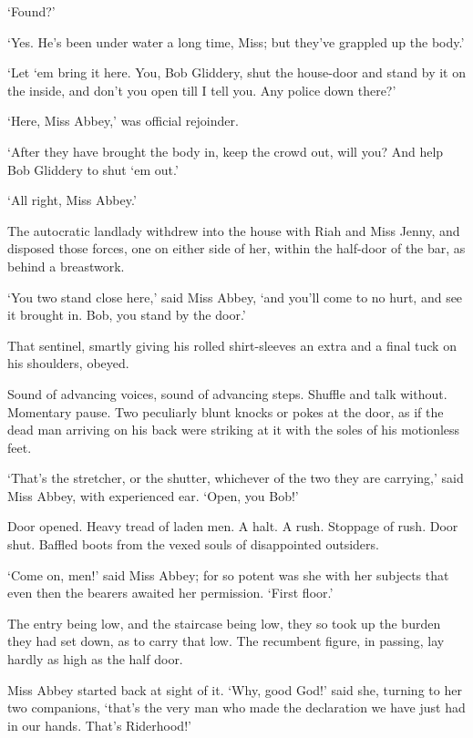 ‘Found?’

‘Yes. He’s been under water a long time, Miss; but they’ve grappled up
the body.’

‘Let ‘em bring it here. You, Bob Gliddery, shut the house-door and stand
by it on the inside, and don’t you open till I tell you. Any police down
there?’

‘Here, Miss Abbey,’ was official rejoinder.

‘After they have brought the body in, keep the crowd out, will you? And
help Bob Gliddery to shut ‘em out.’

‘All right, Miss Abbey.’

The autocratic landlady withdrew into the house with Riah and Miss
Jenny, and disposed those forces, one on either side of her, within the
half-door of the bar, as behind a breastwork.

‘You two stand close here,’ said Miss Abbey, ‘and you’ll come to no
hurt, and see it brought in. Bob, you stand by the door.’

That sentinel, smartly giving his rolled shirt-sleeves an extra and a
final tuck on his shoulders, obeyed.

Sound of advancing voices, sound of advancing steps. Shuffle and talk
without. Momentary pause. Two peculiarly blunt knocks or pokes at the
door, as if the dead man arriving on his back were striking at it with
the soles of his motionless feet.

‘That’s the stretcher, or the shutter, whichever of the two they are
carrying,’ said Miss Abbey, with experienced ear. ‘Open, you Bob!’

Door opened. Heavy tread of laden men. A halt. A rush. Stoppage of rush.
Door shut. Baffled boots from the vexed souls of disappointed outsiders.

‘Come on, men!’ said Miss Abbey; for so potent was she with her subjects
that even then the bearers awaited her permission. ‘First floor.’

The entry being low, and the staircase being low, they so took up the
burden they had set down, as to carry that low. The recumbent figure, in
passing, lay hardly as high as the half door.

Miss Abbey started back at sight of it. ‘Why, good God!’ said she,
turning to her two companions, ‘that’s the very man who made the
declaration we have just had in our hands. That’s Riderhood!’



